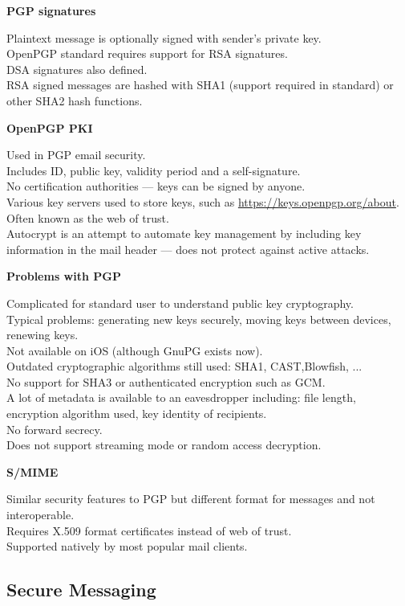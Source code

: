 \documentclass{article}
\begin{document}
\textbf{PGP signatures}

Plaintext message is optionally signed with sender’s private key.\\
OpenPGP standard requires support for RSA signatures.\\
DSA signatures also defined.\\
RSA signed messages are hashed with SHA1 (support required in standard) or other SHA2 hash functions.

\textbf{OpenPGP PKI}

Used in PGP email security.\\
Includes ID, public key, validity period and a self-signature.\\
No certification authorities — keys can be signed by anyone.\\
Various key servers used to store keys, such as \href{https://keys.openpgp.org/about}{https://keys.openpgp.org/about}.\\
Often known as the web of trust.\\
Autocrypt is an attempt to automate key management by including key information in the mail header — does not protect against active attacks.

\textbf{Problems with PGP}

Complicated for standard user to understand public key cryptography.\\
Typical problems: generating new keys securely, moving keys between devices, renewing keys.\\
Not available on iOS (although GnuPG exists now).\\
Outdated cryptographic algorithms still used: SHA1, CAST,Blowfish, ...\\
No support for SHA3 or authenticated encryption such as GCM.\\
A lot of metadata is available to an eavesdropper including: file length, encryption algorithm used, key identity of recipients.\\
No forward secrecy.\\
Does not support streaming mode or random access decryption.

\textbf{S/MIME}

Similar security features to PGP but different format for messages and not interoperable.\\
Requires X.509 format certificates instead of web of trust.\\
Supported natively by most popular mail clients.

\subsection{Secure Messaging}
\end{document}
